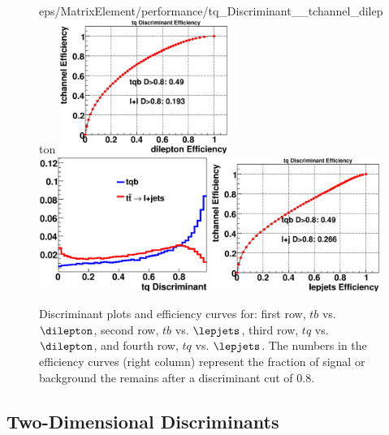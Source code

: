 \begin{figure}[!h!tbp]
{eps/MatrixElement/performance/tq_Discriminant__tchannel_dilepton}
\includegraphics[width=0.49\textwidth]
{eps/MatrixElement/performance/tq_Efficiency__tchannel_dilepton}
\includegraphics[width=0.49\textwidth]
{eps/MatrixElement/performance/tq_Discriminant__tchannel_lepjets}
\includegraphics[width=0.49\textwidth]
{eps/MatrixElement/performance/tq_Efficiency__tchannel_lepjets}
\caption{Discriminant plots and efficiency curves for:
first row, $tb$ vs. $\dilepton$, second row, $tb$ vs. $\lepjets$,
third row, $tq$ vs. $\dilepton$, and fourth row, $tq$
vs. $\lepjets$. The numbers in the efficiency curves (right column)
represent the fraction of signal or background the remains after a
discriminant cut of 0.8.}
\label{disc_ttbar}
\end{figure}

\subsection{Two-Dimensional Discriminants}

